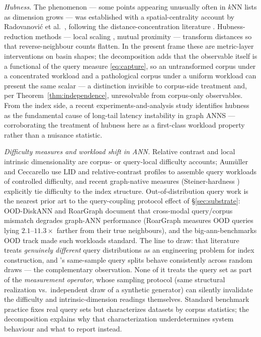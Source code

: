 \documentclass[11pt]{article}
\begin{document}
\emph{Hubness.} The phenomenon --- some points appearing unusually often in
$k$NN lists as dimension grows --- was established with a spatial-centrality
account by Radovanovi\'c et al.~\cite{radovanovic10}, following the
distance-concentration literature \cite{beyer99}. Hubness-reduction methods
--- local scaling \cite{zelnik04}, mutual proximity \cite{schnitzer12} ---
transform distances so that reverse-neighbour counts flatten. In the present
frame these are metric-layer interventions on basin shapes; the
decomposition adds that the observable itself is a functional of the query
measure \eqref{eq:capture}, so an untransformed corpus under a concentrated
workload and a pathological corpus under a uniform workload can present the
same scalar --- a distinction invisible to corpus-side treatment and, per
Theorem~\ref{thm:independence}, unresolvable from corpus-only observables.
From the index side, a recent experiments-and-analysis study \cite{xu26}
identifies hubness as the fundamental cause of long-tail latency
instability in graph ANNS --- corroborating the treatment of hubness here
as a first-class workload property rather than a nuisance statistic.

\emph{Difficulty measures and workload shift in ANN.} Relative contrast
\cite{he12} and local intrinsic dimensionality \cite{levina04,facco17} are
corpus- or query-local difficulty accounts; Aum\"uller and Ceccarello
\cite{aumuller21} use LID and relative-contrast profiles to assemble query
workloads of controlled difficulty, and recent graph-native measures
(Steiner-hardness \cite{steiner24}) explicitly tie difficulty to the index
structure. Out-of-distribution query work is the nearest prior art to the
query-coupling protocol effect of \S\ref{sec:substrate}: OOD-DiskANN
\cite{jaiswal22} and RoarGraph \cite{roargraph24} document that cross-modal
query/corpus mismatch degrades graph-ANN performance (RoarGraph measures
OOD queries lying $2.1$--$11.3\times$ farther from their true neighbours),
and the big-ann-benchmarks OOD track \cite{simhadri21} made such workloads
standard. The line to draw: that literature treats \emph{genuinely
different} query distributions as an engineering problem for index
construction, and \cite{aumuller21}'s same-sample query splits behave
consistently across random draws --- the complementary observation. None of
it treats the query set as part of the \emph{measurement operator}, whose
sampling protocol (same structural realization vs.\ independent draw of a
synthetic generator) can silently invalidate the difficulty and
intrinsic-dimension readings themselves. Standard benchmark practice
\cite{aumuller20,simhadri21} fixes real query sets but characterizes
datasets by corpus statistics; the decomposition explains why that
characterization underdetermines system behaviour and what to report
instead.
\end{document}
